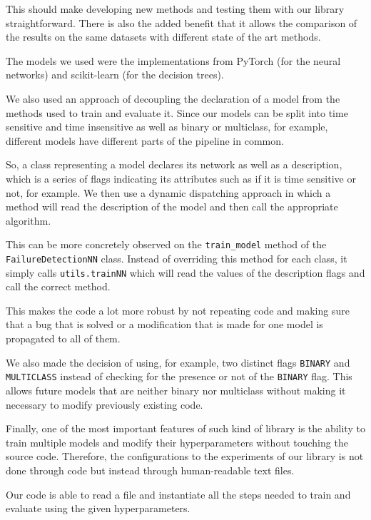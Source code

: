 This should make developing new methods and testing them with our library straightforward.
There is also the added benefit that it allows the comparison of the results on the same datasets with different state of the art methods.

The models we used were the implementations from PyTorch (for the neural networks) and scikit-learn (for the decision trees).

We also used an approach of decoupling the declaration of a model from the methods used to train and evaluate it.
Since our models can be split into time sensitive and time insensitive as well as binary or multiclass, for example, different models have different parts of the pipeline in common.

So, a class representing a model declares its network as well as a description, which is a series of flags indicating its attributes such as if it is time sensitive or not, for example.
We then use a dynamic dispatching approach in which a method will read the description of the model and then call the appropriate algorithm.

This can be more concretely observed on the \verb|train_model| method of the \\ \verb|FailureDetectionNN| class.
Instead of overriding this method for each class, it simply calls \verb|utils.trainNN| which will read the values of the description flags and call the correct method.

This makes the code a lot more robust by not repeating code and making sure that a bug that is solved or a modification that is made for one model is propagated to all of them.

We also made the decision of using, for example, two distinct flags \verb|BINARY| and \\ \verb|MULTICLASS| instead of checking for the presence or not of the \verb|BINARY| flag.
This allows future models that are neither binary nor multiclass without making it necessary to modify previously existing code.

Finally, one of the most important features of such kind of library is the ability to train multiple models and modify their hyperparameters without touching the source code.
Therefore, the configurations to the experiments of our library is not done through code but instead through human-readable text files.

Our code is able to read a file and instantiate all the steps needed to train and evaluate using the given hyperparameters.

